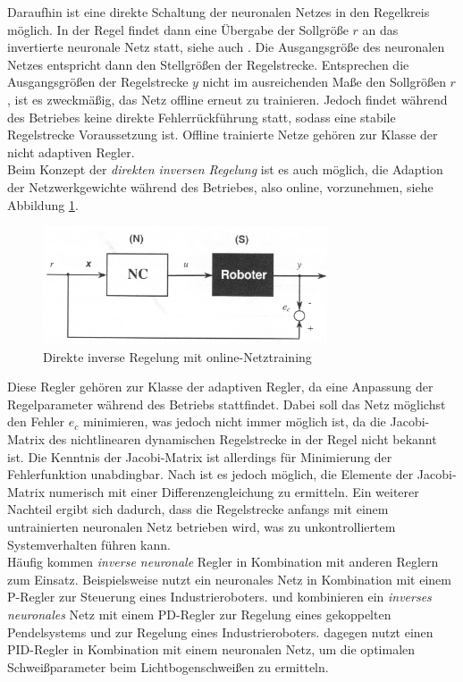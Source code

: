Daraufhin ist eine direkte Schaltung der neuronalen Netzes in den Regelkreis möglich.  In der Regel findet dann eine Übergabe der Sollgröße $r$ an das invertierte neuronale Netz statt, siehe auch \cite{Almusawi.2016}. Die Ausgangsgröße des neuronalen Netzes entspricht dann den Stellgrößen der Regelstrecke.  Entsprechen die Ausgangsgrößen der Regelstrecke $y$ nicht im ausreichenden Maße den Sollgrößen $r$, ist es zweckmäßig, das Netz offline erneut zu trainieren. Jedoch findet während des Betriebes keine direkte Fehlerrückführung statt, sodass eine stabile Regelstrecke Voraussetzung ist. Offline trainierte Netze gehören zur Klasse der nicht adaptiven Regler.   \\
Beim Konzept der \textit{direkten inversen Regelung} ist es auch möglich, die Adaption der Netzwerkgewichte während des Betriebes, also online, vorzunehmen, siehe Abbildung \ref{fig:direct_inverse_online}. 

\begin{figure} [h]
	\centering
	\includegraphics[width=0.75\textwidth]{images/direct_inverse_control_online}
	\caption{Direkte inverse Regelung mit online-Netztraining \cite{Sklyarenko.2002}}
	\label{fig:direct_inverse_online}
\end{figure}

Diese Regler gehören zur Klasse der adaptiven Regler, da eine Anpassung der Regelparameter während des Betriebs stattfindet. Dabei soll das Netz möglichst den Fehler $e_c$ minimieren, was jedoch nicht immer möglich ist, da die Jacobi-Matrix des nichtlinearen dynamischen Regelstrecke in der Regel nicht bekannt ist. Die Kenntnis der Jacobi-Matrix ist allerdings für Minimierung der Fehlerfunktion unabdingbar. Nach \cite{Sklyarenko.2002} ist es jedoch möglich, die Elemente der Jacobi-Matrix numerisch mit einer Differenzengleichung zu ermitteln. Ein weiterer Nachteil ergibt sich dadurch, dass die Regelstrecke anfangs mit einem untrainierten neuronalen Netz betrieben wird, was zu unkontrolliertem Systemverhalten führen kann. \\

Häufig kommen \textit{inverse neuronale} Regler in Kombination mit anderen Reglern zum Einsatz. Beispielsweise nutzt \cite{Miller.1989} ein neuronales Netz in Kombination mit einem P-Regler zur Steuerung eines Industrieroboters. \cite{Nordgren.1993} und \cite{Jung.1995} kombinieren ein \textit{inverses neuronales} Netz mit einem PD-Regler zur Regelung eines gekoppelten Pendelsystems und zur Regelung eines Industrieroboters. \cite{Andersen.1990} dagegen nutzt einen PID-Regler in Kombination mit einem neuronalen Netz, um die optimalen Schweißparameter beim Lichtbogenschweißen zu ermitteln.   


